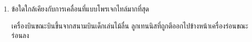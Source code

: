 \begin{enumerate}
\item \runningj \nonet ข้อใดใกล้เคียงกับการเคลื่อนที่แบบโพรเจกไทล์มากที่สุด
\begin{2c}
	{เครื่องบินขณะบินขึ้นจากสนามบิน}{เด็กเล่นไม้ลื่น}
	{ลูกเทนนิสที่ถูกตีออกไปข้างหน้า}{เครื่องร่อนขณะร่อนลง}
\end{2c}
\end{enumerate}
